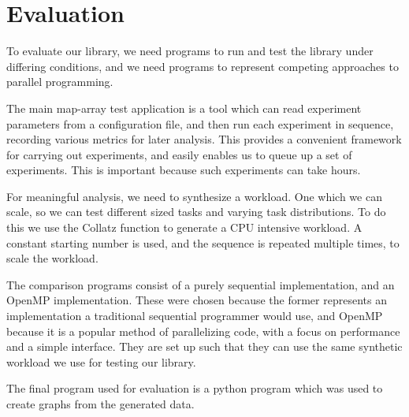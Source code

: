 \section{Evaluation}

To evaluate our library, we need programs to run and test the library under differing conditions, and we need programs to represent competing approaches to parallel programming. 

The main map-array test application is a tool which can read experiment parameters from a configuration file, and then run each experiment in sequence, recording various metrics for later analysis. This provides a convenient framework for carrying out experiments, and easily enables us to queue up a set of experiments. This is important because such experiments can take hours.

For meaningful analysis, we need to synthesize a workload. One which we can scale, so we can test different sized tasks and varying task distributions. To do this we use the Collatz function to generate a CPU intensive workload. A constant starting number is used, and the sequence is repeated multiple times, to scale the workload.

The comparison programs consist of a purely sequential implementation, and an OpenMP implementation. These were chosen because the former represents an implementation a traditional sequential programmer would use, and OpenMP because it is a popular method of parallelizing code, with a focus on performance and a simple interface. They are set up such that they can use the same synthetic workload we use for testing our library.

The final program used for evaluation is a python program which was used to create graphs from the generated data.